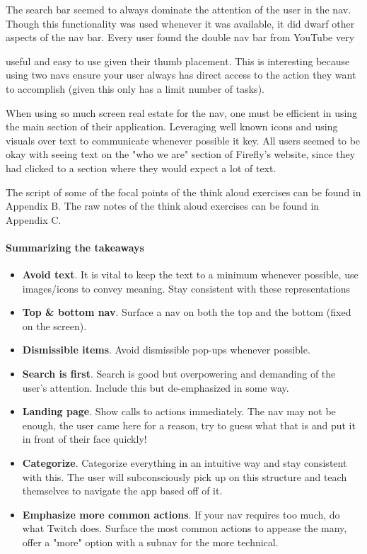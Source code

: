 The search bar seemed to always dominate the attention of the user in the nav. Though this functionality was used whenever it was available, it did dwarf other aspects of the nav bar. Every user found the double nav bar from YouTube very

\clearpage

useful and easy to use given their thumb placement. This is interesting because using two navs ensure your user always has direct access to the action they want to accomplish (given this only has a limit number of tasks).

When using so much screen real estate for the nav, one must be efficient in using the main section of their application. Leveraging well known icons and using visuals over text to communicate whenever possible it key. All users seemed to be okay with seeing text on the "who we are" section of Firefly's website, since they had clicked to a section where they would expect a lot of text.

The script of some of the focal points of the think aloud exercises can be found in Appendix B. The raw notes of the think aloud exercises can be found in Appendix C.

\paragraph{Summarizing the takeaways}
\begin{itemize}
  \item
    \textbf{Avoid text}. It is vital to keep the text to a minimum whenever possible, use images/icons to convey meaning. Stay consistent with these representations
  \item
    \textbf{Top & bottom nav}. Surface a nav on both the top and the bottom (fixed on the screen).
  \item
    \textbf{Dismissible items}. Avoid dismissible pop-ups whenever possible.
  \item
    \textbf{Search is first}. Search is good but overpowering and demanding of the user's attention. Include this but de-emphasized in some way.
  \item
    \textbf{Landing page}. Show calls to actions immediately. The nav may not be enough, the user came here for a reason, try to guess what that is and put it in front of their face quickly!
  \item
    \textbf{Categorize}. Categorize everything in an intuitive way and stay consistent with this. The user will subconsciously pick up on this structure and teach themselves to navigate the app based off of it.
  \item
    \textbf{Emphasize more common actions}. If your nav requires too much, do what Twitch does. Surface the most common actions to appease the many, offer a "more" option with a subnav for the more technical.
\end{itemize}

